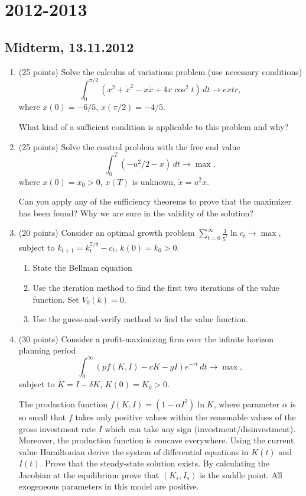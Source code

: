 \documentclass[12pt, a4paper]{article}
\begin{document}
\section{2012-2013}

\subsection{Midterm, 13.11.2012}

\begin{enumerate}
\item (25 points) Solve the calculus of variations problem (use necessary conditions)
\[
\int_0^{\pi/2}(x^2 + \dot x^2 - x\dot x + 4x\cos^2 t) \, dt \to extr,
\]
where $x(0)=-6/5$, $x(\pi/2)=-4/5$.

What kind of a sufficient condition is applicable to this problem and why?

\item	(25 points) Solve the control problem with the free end value
\[
\int_0^T (- u^2/2-x)\, dt \to \max,
\]
where $x(0)=x_0>0$, $x(T)$  is unknown, $\dot x=u^2x$.

Can you apply any of the sufficiency theorems to prove that the maximizer has been found? Why we are sure in the validity of the solution?


\item	(20 points) Consider an optimal growth problem $\sum_{t=0}^{\infty} \frac{1}{5^t} \ln c_t \to \max$, subject to $k_{t+1}=k_t^{7/8}-c_t$, $k(0)=k_0 >0$.
\begin{enumerate}
\item	State the Bellman equation
\item Use the iteration method to find the first two iterations of the value function. Set $V_0(k)=0$.
\item Use the guess-and-verify method to find the value function.
\end{enumerate}

\item	(30 points) Consider a profit-maximizing firm over the infinite horizon planning period
\[
\int_0^{\infty} (pf(K,I)-cK-gI)e^{-rt}\,dt \to \max,
\]
subject to  $\dot K=I-\delta K$,  $K(0)=K_0 > 0$.

The production function $f(K,I)=(1-\alpha I^2) \ln K$, where parameter $\alpha$ is so small that $f$ takes only positive values within the reasonable values of the gross investment rate $I$ which can take any sign (investment/disinvestment). Moreover, the production function is concave everywhere. Using the current value Hamiltonian derive the system of differential equations in $K(t)$ and $I(t)$. Prove that the steady-state solution exists. By calculating the Jacobian at the equilibrium prove that $(K_s, I_s)$   is the saddle point. All exogeneous parameters in this model are positive.
\end{enumerate}
\end{document}
